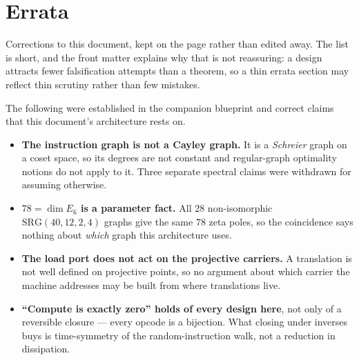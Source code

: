 \documentclass[11pt]{article}
\begin{document}
%

\section{Errata}
\label{sec:photonic-errata}

\begin{plainbox}
Corrections to this document, kept on the page rather than edited away. The list is short,
and the front matter explains why that is not reassuring: a design attracts fewer
falsification attempts than a theorem, so a thin errata section may reflect thin scrutiny
rather than few mistakes.
\end{plainbox}

\begin{warnbox}
The following were established in the companion blueprint and correct claims that this
document's architecture rests on.

\begin{itemize}\itemsep2pt
\item \textbf{The instruction graph is not a Cayley graph.} It is a \emph{Schreier} graph
      on a coset space, so its degrees are not constant and regular-graph optimality
      notions do not apply to it. Three separate spectral claims were withdrawn for
      assuming otherwise.
\item \textbf{$78 = \dim E_6$ is a parameter fact.} All $28$ non-isomorphic
      $\mathrm{SRG}(40,12,2,4)$ graphs give the same $78$ zeta poles, so the coincidence
      says nothing about \emph{which} graph this architecture uses.
\item \textbf{The load port does not act on the projective carriers.} A translation is not
      well defined on projective points, so no argument about which carrier the machine
      addresses may be built from where translations live.
\item \textbf{``Compute is exactly zero'' holds of every design here}, not only of a
      reversible closure --- every opcode is a bijection. What closing under inverses buys
      is time-symmetry of the random-instruction walk, not a reduction in dissipation.
\end{itemize}
\end{warnbox}
\end{document}
